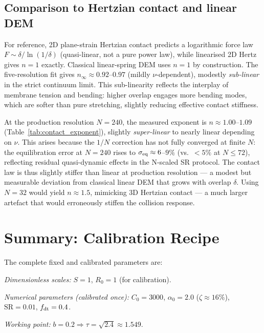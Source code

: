 \documentclass[aps,pre,twocolumn,floatfix,longbibliography]{revtex4-2}
\newcommand{\SR}{\mathrm{SR}}
\begin{document}
\subsection{Comparison to Hertzian contact and linear DEM}

For reference, 2D plane-strain Hertzian contact predicts a logarithmic
force law $F \sim \delta/\ln(1/\delta)$ (quasi-linear, not a pure power
law), while linearised 2D Hertz gives $n = 1$ exactly.  Classical
linear-spring DEM uses $n = 1$ by construction.  The five-resolution fit gives $n_\infty \approx 0.92$--$0.97$
(mildly $\nu$-dependent), modestly \emph{sub-linear} in the strict
continuum limit.  This sub-linearity reflects the interplay of membrane
tension and bending: higher overlap engages more bending modes, which are
softer than pure stretching, slightly reducing effective contact stiffness.

At the production resolution $N = 240$, the measured exponent is
$n \approx 1.00$--$1.09$ (Table~\ref{tab:contact_exponent}), slightly
\emph{super-linear} to nearly linear depending on $\nu$.  This arises because the $1/N$ correction has not
fully converged at finite $N$: the equilibration error at $N = 240$
rises to $\sigma_{\rm eq} \approx 6$--$9\%$ (vs.\ $< 5\%$ at $N \leq 72$),
reflecting residual quasi-dynamic effects in the N-scaled SR protocol.
The contact law is thus slightly stiffer than linear at production
resolution — a modest but measurable deviation from classical linear
DEM that grows with overlap $\delta$.  Using $N = 32$ would yield
$n \approx 1.5$, mimicking 3D Hertzian contact — a much larger artefact
that would erroneously stiffen the collision response.

\section{Summary: Calibration Recipe}
\label{sec:recipe}

The complete fixed and calibrated parameters are:

\textit{Dimensionless scales:} $S = 1$, $R_0 = 1$ (for calibration).

\textit{Numerical parameters (calibrated once):}
$C_0 = 3000$, $\alpha_0 = 2.0$ ($\zeta \approx 16\%$), $\SR = 0.01$,
$f_{\rm dt} = 0.4$.

\textit{Working point:} $b = 0.2 \Rightarrow \tau = \sqrt{2.4} \approx 1.549$.
\end{document}
